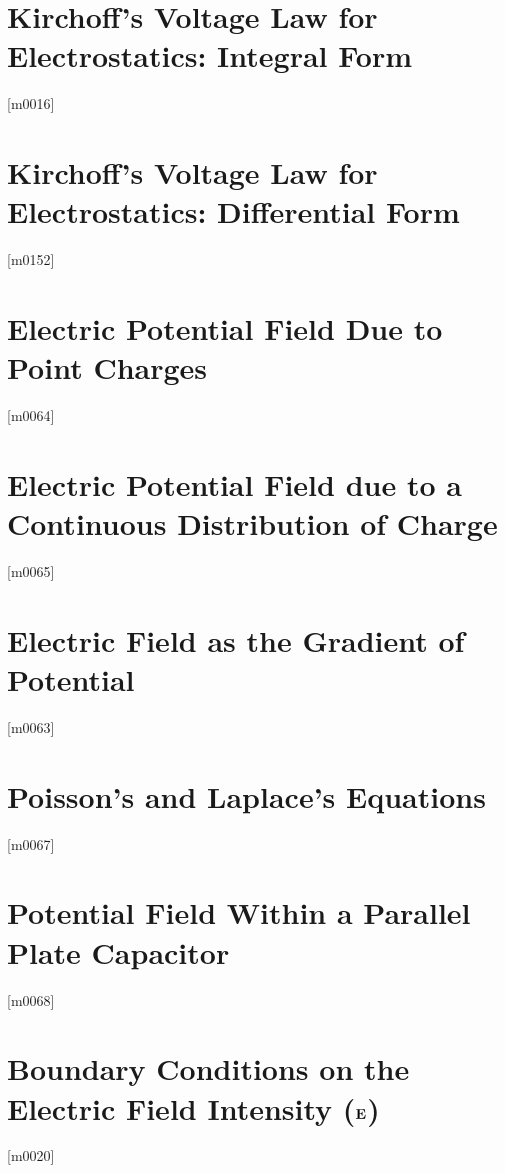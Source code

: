 \documentclass[10pt,letterpaper,twocolumn,openany]{book}
\theoremstyle{definition} %
\begin{document}
    \section{Kirchoff's Voltage Law for Electrostatics: Integral Form}
{\color{blue}\tiny[m0016]}      
      \vfill\break
    \section{Kirchoff's Voltage Law for Electrostatics: Differential Form}
{\color{blue}\tiny[m0152]}      
      \vfill\break
    \section{Electric Potential Field Due to Point Charges}
{\color{blue}\tiny[m0064]}      
      \vfill\break
    \section{Electric Potential Field due to a Continuous Distribution of Charge}
{\color{blue}\tiny[m0065]}      
      \vfill\break
    \section{Electric Field as the Gradient of Potential}
{\color{blue}\tiny[m0063]}      
      \vfill\break
    \section{Poisson's and Laplace's Equations}
{\color{blue}\tiny[m0067]}      
      \vfill\break
    \section{Potential Field Within a Parallel Plate Capacitor}
{\color{blue}\tiny[m0068]}      
      \vfill\break
    \section{Boundary Conditions on the Electric Field Intensity (${\bf E}$)}
{\color{blue}\tiny[m0020]}      
      \vfill\break
\end{document}
